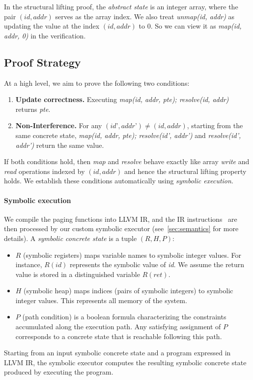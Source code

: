 In the structural lifting proof, the \emph{abstract state} is an integer array, where the pair \((\textit{id}, \textit{addr})\) serves as the array index. We also treat \textit{unmap(id, addr)} as updating the value at the index \((\textit{id}, \textit{addr})\) to 0. So we can view it as \textit{map(id, addr, 0)} in the verification.

\subsection{Proof Strategy}
At a high level, we aim to prove the following two conditions:

\begin{enumerate}[leftmargin=*]
  \item \textbf{Update correctness.} Executing \textit{map(id, addr, pte); resolve(id, addr)} returns \textit{pte}.
  \item \textbf{Non-Interference.} For any \((\textit{id'}, \textit{addr'}) \neq (\textit{id}, \textit{addr})\), starting from the same concrete state,  
    \textit{map(id, addr, pte); resolve(id', addr')}  
    and  
    \textit{resolve(id', addr')}  
    return the same value.
\end{enumerate}

If both conditions hold, then \textit{map} and \textit{resolve} behave exactly like array \textit{write} and \textit{read} operations indexed by \((\textit{id}, \textit{addr})\) and hence the structural lifting property holds. 
We establish these conditions automatically using \emph{symbolic execution}.

\paragraph{Symbolic execution}
We compile the paging functions into LLVM IR, and the IR instructions~\cite{llvminst} are then processed by our custom symbolic executor (see~\autoref{sec:semantics} for more details).  
A \emph{symbolic concrete state} is a tuple \((R, H, P)\):
\begin{itemize}[leftmargin=*]
    \item \(R\) (symbolic registers) maps variable names to symbolic integer values.
    For instance, $R(\textit{id})$ represents the symbolic value of \textit{id}. We assume the return value is stored in a distinguished variable $R(\textit{ret})$.
    \item \(H\) (symbolic heap) maps indices (pairs of symbolic integers) to symbolic integer values. This represents all memory of the system.
    \item \(P\) (path condition) is a boolean formula characterizing the constraints accumulated along the execution path. Any satisfying assignment of \(P\) corresponds to a concrete state that is reachable following this path.
\end{itemize}
Starting from an input symbolic concrete state and a program expressed in LLVM IR, the symbolic executor computes the resulting symbolic concrete state produced by executing the program.

